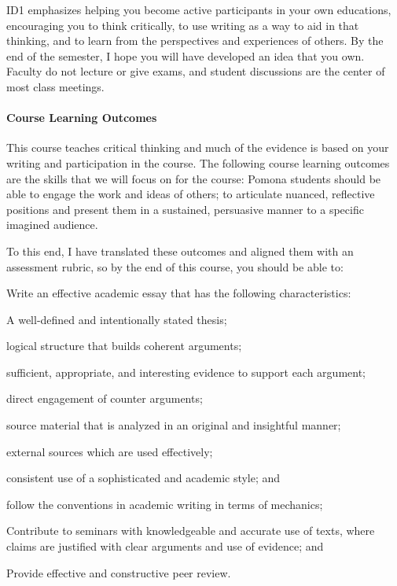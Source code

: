 ID1 emphasizes helping you become active participants in your own educations, encouraging you to think critically, to use writing as a way to aid in that thinking, and to learn from the perspectives and experiences of others. By the end of the semester, I hope you will have developed an idea that you own. Faculty do not lecture or give exams, and student discussions are the center of most class meetings.

\paragraph{Course Learning Outcomes} 

This course teaches critical thinking and much of the evidence is based on your writing and participation in the course. The following course learning outcomes are the skills that we will focus on for the course: Pomona students should be able to engage the work and ideas of others; to articulate nuanced, reflective positions and present them in a sustained, persuasive manner to a specific imagined audience.

To this end, I have translated these outcomes and aligned them with an assessment rubric, so by the end of this course, you should be able to:

\begin{enumerate*}
  \item Write an effective academic essay that has the following characteristics:
    \begin{itemize*}
      \item A well-defined and intentionally stated thesis;
      \item logical structure that builds coherent arguments;
      \item sufficient, appropriate, and interesting evidence to support each argument;
      \item direct engagement of counter arguments;
      \item source material that is analyzed in an original and insightful manner;
      \item external sources which are used effectively;
      \item consistent use of a sophisticated and academic style; and
      \item follow the conventions in academic writing in terms of mechanics;
    \end{itemize*}
  \item Contribute to seminars with knowledgeable and accurate use of texts, where claims are justified with clear arguments and use of evidence; and
  \item Provide effective and constructive peer review.
\end{enumerate*}

